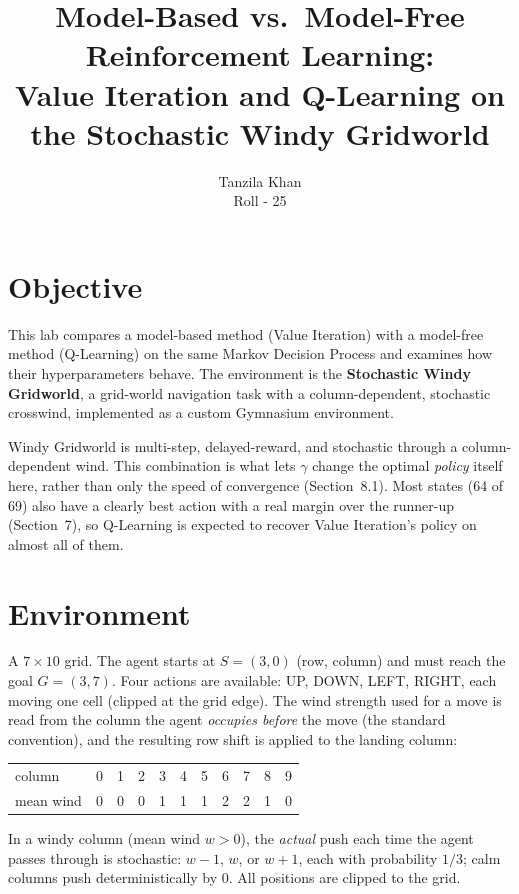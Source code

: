\documentclass[11pt]{article}
\title{Model-Based vs.\ Model-Free Reinforcement Learning:\\
Value Iteration and Q-Learning on the Stochastic Windy Gridworld}
\author{Tanzila Khan \\ Roll - 25}
\date{}
\begin{document}
\maketitle

\section{Objective}

This lab compares a model-based method (Value Iteration) with a model-free
method (Q-Learning) on the same Markov Decision Process and examines how
their hyperparameters behave. The environment is the \textbf{Stochastic
Windy Gridworld}, a grid-world navigation task with a column-dependent,
stochastic crosswind, implemented as a custom Gymnasium environment.

Windy Gridworld is multi-step, delayed-reward, and stochastic through a
column-dependent wind. This combination is what lets $\gamma$ change the
optimal \emph{policy} itself here, rather than only the speed of
convergence (Section~8.1). Most states (64 of 69) also have a clearly best
action with a real margin over the runner-up (Section~7), so Q-Learning is
expected to recover Value Iteration's policy on almost all of them.

\section{Environment}

A $7\times10$ grid. The agent starts at $S=(3,0)$
(row, column) and must reach the goal $G=(3,7)$. Four actions are available:
UP, DOWN, LEFT, RIGHT, each moving one cell (clipped at the grid edge). The
wind strength used for a move is read from the column the agent
\emph{occupies before} the move (the standard convention), and the resulting
row shift is applied to the landing column:

\begin{center}
\begin{tabular}{lcccccccccc}
column & 0 & 1 & 2 & 3 & 4 & 5 & 6 & 7 & 8 & 9 \\
mean wind & 0 & 0 & 0 & 1 & 1 & 1 & 2 & 2 & 1 & 0 \\
\end{tabular}
\end{center}

In a windy column (mean wind $w>0$), the \emph{actual} push each time the
agent passes through is stochastic: $w-1$, $w$, or $w+1$, each with
probability $1/3$; calm columns push deterministically by $0$. All
positions are clipped to the grid.
\end{document}
